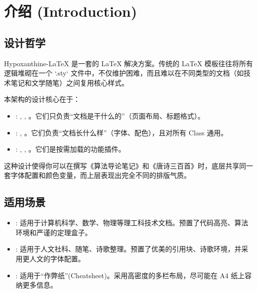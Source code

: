 \documentclass[
    outputdir=build,
    colorscheme=Tech,
    shorthand=true,
    code=true,
    fontset=lit
]{Hypo-Note}
\begin{document}
\makecover

\frontmatter
\tableofcontents

\mainmatter

\chapter{介绍 (Introduction)}

\section{设计哲学}

Hypoxanthine-LaTeX 是一套的 LaTeX 解决方案。传统的 LaTeX 模板往往将所有逻辑堆砌在一个 `.sty` 文件中，不仅维护困难，而且难以在不同类型的文档（如技术笔记和文学随笔）之间复用核心样式。

本架构的设计核心在于：
\begin{itemize}
    \item {}: , , 。它们只负责“文档是干什么的”（页面布局、标题格式）。
    \item {}: , 。它们负责“文档长什么样”（字体、配色），且对所有 Class 通用。
    \item {}: , , 。它们是按需加载的功能插件。
\end{itemize}

这种设计使得你可以在撰写《算法导论笔记》和《唐诗三百首》时，底层共享同一套字体配置和颜色变量，而上层表现出完全不同的排版气质。

\section{适用场景}

\begin{itemize}
    \item {}: 适用于计算机科学、数学、物理等理工科技术文档。预置了代码高亮、算法环境和严谨的定理盒子。
    \item {}: 适用于人文社科、随笔、诗歌整理。预置了优美的引用块、诗歌环境，并采用更人文的字体配置。
    \item {}: 适用于“作弊纸”(Cheatsheet)。采用高密度的多栏布局，尽可能在 A4 纸上容纳更多信息。
\end{itemize}
\end{document}
